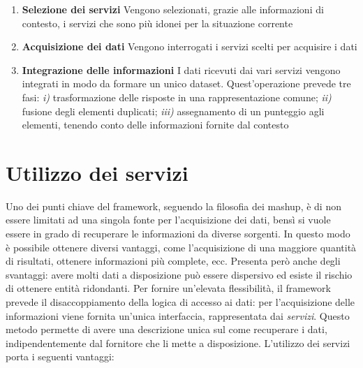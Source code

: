 \begin{enumerate}
	\item \textbf{Selezione dei servizi} Vengono selezionati, grazie alle informazioni di contesto, i servizi che sono più idonei per la situazione corrente
	\item \textbf{Acquisizione dei dati} Vengono interrogati i servizi scelti per acquisire i dati
	\item \textbf{Integrazione delle informazioni} I dati ricevuti dai vari servizi vengono integrati in modo da formare un unico dataset. Quest'operazione prevede tre fasi: \emph{i)} trasformazione delle risposte in una rappresentazione comune; \emph{ii)} fusione degli elementi duplicati; \emph{iii)} assegnamento di un punteggio agli elementi, tenendo conto delle informazioni fornite dal contesto
\end{enumerate}

\section{Utilizzo dei servizi\label{sec:utilizzo-servizi}}

Uno dei punti chiave del framework, seguendo la filosofia dei mashup, è di non essere limitati ad una singola fonte per l'acquisizione dei dati, bensì si vuole essere in grado di recuperare le informazioni da diverse sorgenti. In questo modo è possibile ottenere diversi vantaggi, come l'acquisizione di una maggiore quantità di risultati, ottenere informazioni più complete, ecc. Presenta però anche degli svantaggi: avere molti dati a disposizione può essere dispersivo ed esiste il rischio di ottenere entità ridondanti. Per fornire un'elevata flessibilità, il framework prevede il disaccoppiamento della logica di accesso ai dati: per l'acquisizione delle informazioni viene fornita un'unica interfaccia, rappresentata dai \emph{servizi}. Questo metodo permette di avere una descrizione unica sul come recuperare i dati, indipendentemente dal fornitore che li mette a disposizione. L'utilizzo dei servizi porta i seguenti vantaggi:

